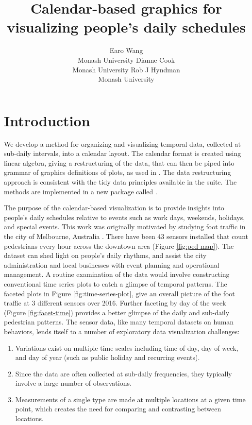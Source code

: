 \documentclass[article]{jss}
\author{
Earo Wang\\Monash University \And Dianne Cook\\Monash University \And Rob J Hyndman\\Monash University
}
\title{Calendar-based graphics for visualizing people's daily schedules}
\providecommand{\tightlist}{%
  \setlength{\itemsep}{0pt}\setlength{\parskip}{0pt}}
\theoremstyle{definition}
\theoremstyle{definition}
\theoremstyle{definition}
\theoremstyle{remark}
\begin{document}
\section{Introduction}\label{introduction}

We develop a method for organizing and visualizing temporal data,
collected at sub-daily intervals, into a calendar layout. The calendar
format is created using linear algebra, giving a restructuring of the
data, that can then be piped into grammar of graphics definitions of
plots, as used in  \citep{R-ggplot2}. The data
restructuring approach is consistent with the tidy data principles
available in the  \citep{R-tidyverse} suite. The methods
are implemented in a new package called 
\citep{R-sugrrants} .

The purpose of the calendar-based visualization is to provide insights
into people's daily schedules relative to events such as work days,
weekends, holidays, and special events. This work was originally
motivated by studying foot traffic in the city of Melbourne, Australia
\citep{ped}. There have been 43 sensors installed that count pedestrians
every hour across the downtown area (Figure \ref{fig:ped-map}). The
dataset can shed light on people's daily rhythms, and assist the city
administration and local businesses with event planning and operational
management. A routine examination of the data would involve constructing
conventional time series plots to catch a glimpse of temporal patterns.
The faceted plots in Figure \ref{fig:time-series-plot}, give an overall
picture of the foot traffic at 3 different sensors over 2016. Further
faceting by day of the week (Figure \ref{fig:facet-time}) provides a
better glimpse of the daily and sub-daily pedestrian patterns. The
sensor data, like many temporal datasets on human behaviors, lends
itself to a number of exploratory data visualization challenges:

\begin{enumerate}
\def\labelenumi{\arabic{enumi}.}
\tightlist
\item
  Variations exist on multiple time scales including time of day, day of
  week, and day of year (such as public holiday and recurring events).
\item
  Since the data are often collected at sub-daily frequencies, they
  typically involve a large number of observations.
\item
  Measurements of a single type are made at multiple locations at a
  given time point, which creates the need for comparing and contrasting
  between locations.
\end{enumerate}
\end{document}
